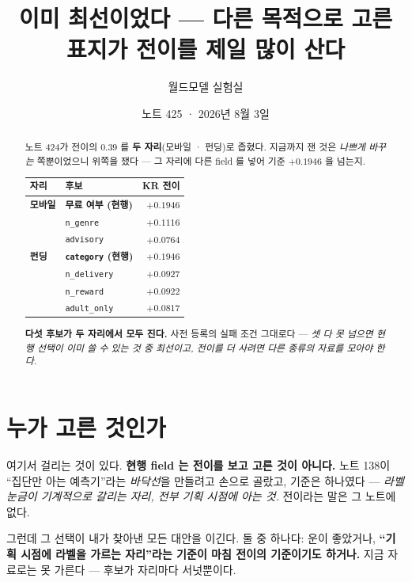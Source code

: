 \documentclass[11pt]{article}
\begin{document}
\title{이미 최선이었다 --- 다른 목적으로 고른 표지가 전이를 제일 많이 산다}
\author{월드모델 실험실}
\date{노트 425 · 2026년 8월 3일}
\maketitle

\begin{abstract}
노트 424가 전이의 $0.39$ 를 \textbf{두 자리}(모바일 · 펀딩)로 좁혔다.
지금까지 잰 것은 \emph{나쁘게 바꾸는} 쪽뿐이었으니 위쪽을 쟀다 --- 그 자리에
다른 field 를 넣어 기준 $+0.1946$ 을 넘는지.

\begin{center}
\begin{tabular}{llr}
\hline
자리 & 후보 & KR 전이 \\
\hline
\textbf{모바일} & \textbf{무료 여부 (현행)} & $\mathbf{+0.1946}$ \\
 & \texttt{n\_genre} & $+0.1116$ \\
 & \texttt{advisory} & $+0.0764$ \\
\hline
\textbf{펀딩} & \textbf{\texttt{category} (현행)} & $\mathbf{+0.1946}$ \\
 & \texttt{n\_delivery} & $+0.0927$ \\
 & \texttt{n\_reward} & $+0.0922$ \\
 & \texttt{adult\_only} & $+0.0817$ \\
\hline
\end{tabular}
\end{center}

\textbf{다섯 후보가 두 자리에서 모두 진다.} 사전 등록의 실패 조건 그대로다
--- \emph{셋 다 못 넘으면 현행 선택이 이미 쓸 수 있는 것 중 최선이고,
전이를 더 사려면 다른 종류의 자료를 모아야 한다.}
\end{abstract}

\section{누가 고른 것인가}

여기서 걸리는 것이 있다. \textbf{현행 field 는 전이를 보고 고른 것이
아니다.} 노트 138이 ``집단만 아는 예측기''라는 \emph{바닥선}을 만들려고
손으로 골랐고, 기준은 하나였다 --- \emph{라벨 눈금이 기계적으로 갈리는
자리, 전부 기획 시점에 아는 것.} 전이라는 말은 그 노트에 없다.

그런데 그 선택이 내가 찾아낸 모든 대안을 이긴다. 둘 중 하나다: 운이 좋았거나,
\textbf{``기획 시점에 라벨을 가르는 자리''라는 기준이 마침 전이의 기준이기도
하거나.} 지금 자료로는 못 가른다 --- 후보가 자리마다 서넛뿐이다.
\end{document}
